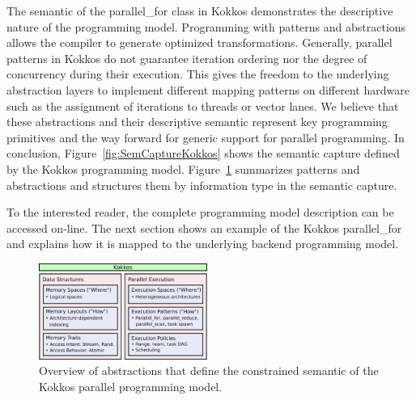 The semantic of the parallel\_for class in Kokkos demonstrates the descriptive nature of the programming model. Programming with patterns and abstractions allows the compiler to generate optimized transformations. 
Generally, parallel patterns in Kokkos do not guarantee iteration ordering nor the degree of concurrency during their execution. This gives the freedom to the underlying abstraction layers to implement different mapping patterns on different hardware such as the assignment of iterations to threads or vector lanes. We believe that these abstractions and their descriptive semantic represent key programming primitives and the way forward for generic support for parallel programming. In conclusion, Figure~\ref{fig:SemCaptureKokkos} shows the semantic capture defined by the Kokkos programming model. Figure~\ref{fig:abstractions} summarizes patterns and abstractions and structures them by information type in the semantic capture.

To the interested reader, the complete programming model description can be accessed on-line\cite{KOKKOS_WIKI}.
The next section shows an example of the Kokkos parallel\_for and explains how it is mapped to the underlying backend programming model.

\begin{figure}[t!]
\centerline{\includegraphics[width=0.49\textwidth]{img/Abstractions.png}}
\caption{Overview of abstractions that define the constrained semantic of the Kokkos parallel programming model.}
\label{fig:abstractions}
\end{figure}

